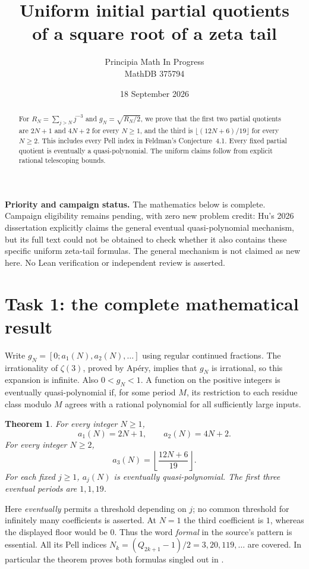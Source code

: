 \documentclass[11pt]{article}
\title{Uniform initial partial quotients\\of a square root of a zeta tail}
\author{Principia Math In Progress\\MathDB 375794}
\date{18 September 2026}
\newtheorem{theorem}{Theorem}
\begin{document}
\maketitle
\begin{abstract}
For $R_N=\sum_{j>N}j^{-3}$ and $g_N=\sqrt{R_N/2}$, we prove that
the first two partial quotients are $2N+1$ and $4N+2$ for every
$N\ge1$, and the third is $\lfloor(12N+6)/19\rfloor$ for every
$N\ge2$. This includes every Pell index in Feldman's Conjecture~4.1.
Every fixed partial quotient is eventually a quasi-polynomial.
The uniform claims follow from explicit rational telescoping bounds.
\end{abstract}
\noindent\textbf{Priority and campaign status.}
The mathematics below is complete. Campaign eligibility remains pending,
with zero new problem credit: Hu's 2026 dissertation explicitly claims
the general eventual quasi-polynomial mechanism, but its full text could
not be obtained to check whether it also contains these specific uniform
zeta-tail formulas. The general mechanism is not claimed as new here.
No Lean verification or independent review is asserted.

\section*{Task 1: the complete mathematical result}
Write $g_N=[0;a_1(N),a_2(N),\ldots]$ using regular continued fractions.
The irrationality of $\zeta(3)$, proved by Ap\'ery, implies that $g_N$
is irrational, so this expansion is infinite. Also $0<g_N<1$.
A function on the positive integers is eventually quasi-polynomial
if, for some period $M$, its restriction to each residue class modulo
$M$ agrees with a rational polynomial for all sufficiently large inputs.

\begin{theorem}\label{thm}
For every integer $N\ge1$,
\[
 a_1(N)=2N+1,\qquad a_2(N)=4N+2.
\]
For every integer $N\ge2$,
\[
 a_3(N)=\left\lfloor\frac{12N+6}{19}\right\rfloor.
\]
For each fixed $j\ge1$, $a_j(N)$ is eventually quasi-polynomial.
The first three eventual periods are $1,1,19$.
\end{theorem}
Here \emph{eventually} permits a threshold depending on $j$; no common
threshold for infinitely many coefficients is asserted. At $N=1$ the
third coefficient is $1$, whereas the displayed floor would be $0$.
Thus the word \emph{formal} in the source's pattern is essential.
All its Pell indices $N_k=(Q_{2k+1}-1)/2=3,20,119,\ldots$ are covered.
In particular the theorem proves both formulas singled out in
\cite[Conjecture~4.1, Remark~4.2, Open Problem~1]{F}.
\end{document}
